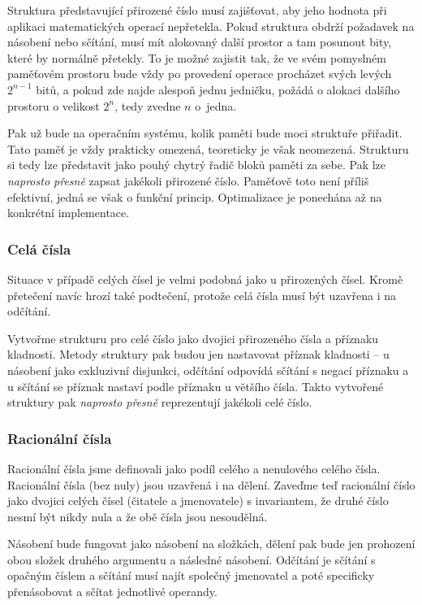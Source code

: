 Struktura představující přirozené číslo musí zajišťovat, aby jeho hodnota při aplikaci matematických operací nepřetekla. Pokud struktura obdrží požadavek na násobení nebo sčítání, musí mít alokovaný další prostor a tam posunout bity, které by normálně přetekly. To je možné zajistit tak, že ve svém pomyslném paměťovém prostoru bude vždy po provedení operace procházet svých levých $2^{n-1}$ bitů, a pokud zde najde alespoň jednu jedničku, požádá o alokaci dalšího prostoru o velikost $2^n$, tedy zvedne $n$ o~jedna.

Pak už bude na operačním systému, kolik paměti bude moci struktuře přiřadit. Tato paměť je vždy prakticky omezená, teoreticky je však neomezená. Strukturu si tedy lze představit jako pouhý chytrý řadič bloků paměti za sebe. Pak lze \textit{naprosto přesně} zapsat jakékoli přirozené číslo. Paměťově toto není příliš efektivní, jedná se však o funkční princip. Optimalizace je ponechána až na konkrétní implementace.

\subsubsection{Celá čísla}
Situace v případě celých čísel je velmi podobná jako u přirozených čísel. Kromě přetečení navíc hrozí také podtečení, protože celá čísla musí být uzavřena i na odčítání. 

Vytvořme strukturu pro celé číslo jako dvojici přirozeného čísla a příznaku kladnosti. Metody struktury pak budou jen nastavovat příznak kladnosti -- u násobení jako exkluzivní disjunkci, odčítání odpovídá sčítání s negací příznaku a u sčítání se příznak nastaví podle příznaku u většího čísla. Takto vytvořené struktury pak \textit{naprosto přesně} reprezentují jakékoli celé číslo.

\subsubsection{Racionální čísla}
Racionální čísla jsme definovali jako podíl celého a nenulového celého čísla. Racionální čísla (bez nuly) jsou uzavřená i na dělení. Zaveďme teď racionální číslo jako dvojici celých čísel (čitatele a jmenovatele) s invariantem, že druhé číslo nesmí být nikdy nula a že obě čísla jsou nesoudělná.

Násobení bude fungovat jako násobení na složkách, dělení pak bude jen prohození obou složek druhého argumentu a následné násobení. Odčítání je sčítání s opačným číslem a sčítání musí najít společný jmenovatel a poté specificky přenásobovat a sčítat jednotlivé operandy.


